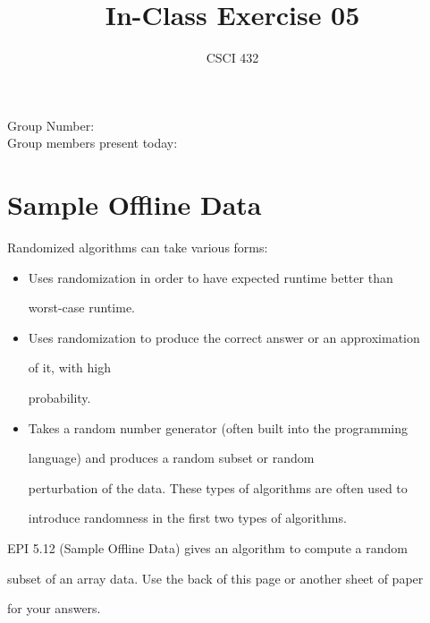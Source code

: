 \documentclass{article}
\title{In-Class Exercise 05}
\author{CSCI 432}
\begin{document}
\maketitle



\noindent

Group Number:\\

Group members present today:



\section*{Sample Offline Data}

Randomized algorithms can take various forms:

\begin{itemize}

    \item Uses randomization in order to have expected runtime better than

        worst-case runtime.

    \item Uses randomization to produce the correct answer or an approximation

        of it, with high

        probability.

    \item Takes a random number generator (often built into the programming

        language) and produces a random subset or random

        perturbation of the data.  These types of algorithms are often used to

        introduce randomness in the first two types of algorithms.

\end{itemize}

EPI 5.12 (Sample Offline Data) gives an algorithm to compute a random

subset of an array data.  Use the back of this page or another sheet of paper

for your answers.
\end{document}
